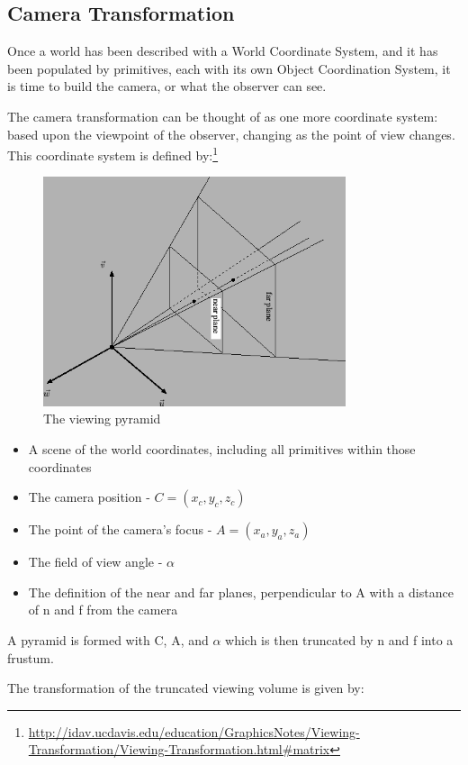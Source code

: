 \documentclass{article}
\begin{document}
\subsection{Camera Transformation}
Once a world has been described with a World Coordinate System, and it has been populated by primitives, each with its own Object Coordination System, it is time to build the camera, or what the observer can see.

The camera transformation can be thought of as one more coordinate system: based upon the viewpoint of the observer, changing as the point of view changes. This coordinate system is defined  by:\footnote{\url{http://idav.ucdavis.edu/education/GraphicsNotes/Viewing-Transformation/Viewing-Transformation.html\#matrix}}

\begin{figure}[H]
    \centering
    \includegraphics[width=3.5in]{viewingpyramid.png}
    \caption{The viewing pyramid}
    \label{pyramid}
\end{figure}

\begin{itemize}
\item A scene of the world coordinates, including all primitives within those coordinates
\item The camera position - $C = (x_{c}, y_{c}, z_{c})$
\item The point of the camera's focus - $A = (x_{a}, y_{a}, z_{a})$
\item The field of view angle - $\alpha$
\item The definition of the near and far planes, perpendicular to A with a distance of n and f from the camera
\end{itemize}

A pyramid is formed with C, A, and $\alpha$ which is then truncated by n and f into a frustum.

The transformation of the truncated viewing volume is given by:
\end{document}
